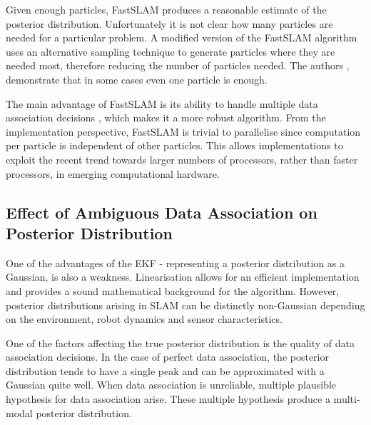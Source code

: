 Given enough particles, FastSLAM produces a reasonable estimate of the
posterior distribution. Unfortunately it is not clear how many particles
are needed for a particular problem. A modified version of the FastSLAM
algorithm \cite{fastslam2} uses an alternative sampling technique to
generate particles where they are needed most, therefore reducing the
number of particles needed. The authors \cite{fastslam2}, demonstrate
that in some cases even one particle is enough.

The main advantage of FastSLAM is its ability to handle multiple data
association decisions \cite{Montemerlo2003}, which makes it a more
robust algorithm. From the implementation perspective, FastSLAM is
trivial to parallelise since computation per particle is independent
of other particles. This allows implementations to exploit the recent
trend towards larger numbers of processors, rather than faster
processors, in emerging computational hardware.

\subsection{Effect of Ambiguous Data Association on Posterior
  Distribution}
\label{sec:AmbiguousDA}

One of the advantages of the EKF - representing a posterior
distribution as a Gaussian, is also a weakness. Linearisation allows
for an efficient implementation and provides a sound mathematical
background for the algorithm. However, posterior distributions arising
in SLAM can be distinctly non-Gaussian depending on the environment,
robot dynamics and sensor characteristics.

One of the factors affecting the true posterior distribution is the
quality of data association decisions. In the case of perfect data
association, the posterior distribution tends to have a single peak
and can be approximated with a Gaussian quite well. When data
association is unreliable, multiple plausible hypothesis for data
association arise. These multiple hypothesis produce a multi-modal
posterior distribution.

